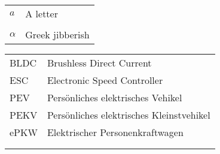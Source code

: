     \begin{table}[h]
        \begin{tabular}{@{}ll@{}}%
            \(a\) & A letter\\
            & \\
            \(\alpha\) & Greek jibberish\\
    \end{tabular}\label{tab:Nomenclature}
    \end{table}

    \begin{table}[h]
        \begin{tabular}{@{}ll@{}}%
            BLDC & Brushless Direct Current \\
            ESC & Electronic Speed Controller\\
            PEV & Persönliches elektrisches Vehikel\\
            PEKV & Persönliches elektrisches Kleinstvehikel\\
            ePKW & Elektrischer Personenkraftwagen\\
            & \\
            & \\
    \end{tabular}\label{tab:acronyms}
    \end{table}